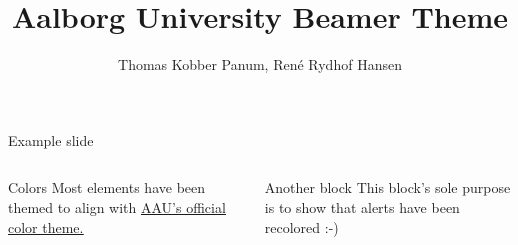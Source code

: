 \documentclass[12pt, aspectratio=43]{beamer} %
\title{Aalborg University Beamer Theme}
\author{Thomas Kobber Panum, René Rydhof Hansen}
\begin{document}
\maketitle

\begin{frame}{Example slide}
  \begin{columns}
    \begin{column}{.45\columnwidth}
      \begin{block}{Colors}
        Most elements have been themed to align with \underline{\href{https://www.design.aau.dk/om-aau-design/Farver/}{AAU's official color theme.}}
      \end{block}
    \end{column}
    \begin{column}{.45\columnwidth}
      \begin{alertblock}{Another block}
        This block's sole purpose is to show that alerts have been recolored :-)
      \end{alertblock}
    \end{column}
  \end{columns}
\end{frame}
\end{document}
